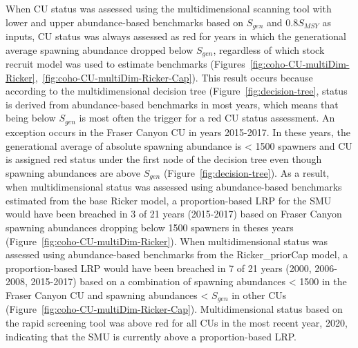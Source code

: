 \documentclass[11pt]{book}
\begin{document}
When CU status was assessed using the multidimensional scanning tool with lower and upper abundance-based benchmarks based on \(S_{gen}\) and 0.8\(S_{MSY}\) as inputs, CU status was always assessed as red for years in which the generational average spawning abundance dropped below \(S_{gen}\), regardless of which stock recruit model was used to estimate benchmarks (Figures~\ref{fig:coho-CU-multiDim-Ricker},~\ref{fig:coho-CU-multiDim-Ricker-Cap}). This result occurs because according to the multidimensional decision tree (Figure~\ref{fig:decision-tree}, status is derived from abundance-based benchmarks in most years, which means that being below \(S_{gen}\) is most often the trigger for a red CU status assessment. An exception occurs in the Fraser Canyon CU in years 2015-2017. In these years, the generational average of absolute spawning abundance is \textless{} 1500 spawners and CU is assigned red status under the first node of the decision tree even though spawning abundances are above \(S_{gen}\) (Figure~\ref{fig:decision-tree}). As a result, when multidimensional status was assessed using abundance-based benchmarks estimated from the base Ricker model, a proportion-based LRP for the SMU would have been breached in 3 of 21 years (2015-2017) based on Fraser Canyon spawning abundances dropping below 1500 spawners in theses years (Figure~\ref{fig:coho-CU-multiDim-Ricker}). When multidimensional status was assessed using abundance-based benchmarks from the Ricker\_priorCap model, a proportion-based LRP would have been breached in 7 of 21 years (2000, 2006-2008, 2015-2017) based on a combination of spawning abundances \textless{} 1500 in the Fraser Canyon CU and spawning abundances \textless{} \(S_{gen}\) in other CUs (Figure~\ref{fig:coho-CU-multiDim-Ricker-Cap}). Multidimensional status based on the rapid screening tool was above red for all CUs in the most recent year, 2020, indicating that the SMU is currently above a proportion-based LRP.
\end{document}
